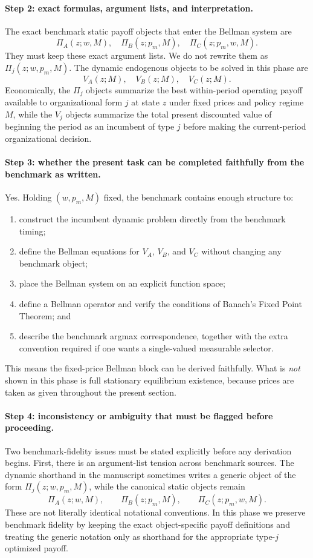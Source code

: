 \paragraph{Step 2: exact formulas, argument lists, and interpretation.}
The exact benchmark static payoff objects that enter the Bellman system are
\[
\Pi_A(z;w,M),\quad \Pi_B(z;p_m,M),\quad \Pi_C(z;p_m,w,M).
\]
They must keep these exact argument lists. We do not rewrite them as $\Pi_j(z;w,p_m,M)$. The dynamic endogenous objects to be solved in this phase are
\[
V_A(z;M),\quad V_B(z;M),\quad V_C(z;M).
\]
Economically, the $\Pi_j$ objects summarize the best within-period operating payoff available to organizational form $j$ at state $z$ under fixed prices and policy regime $M$, while the $V_j$ objects summarize the total present discounted value of beginning the period as an incumbent of type $j$ before making the current-period organizational decision.

\paragraph{Step 3: whether the present task can be completed faithfully from the benchmark as written.}
Yes. Holding $(w,p_m,M)$ fixed, the benchmark contains enough structure to:
\begin{enumerate}
    \item construct the incumbent dynamic problem directly from the benchmark timing;
    \item define the Bellman equations for $V_A$, $V_B$, and $V_C$ without changing any benchmark object;
    \item place the Bellman system on an explicit function space;
    \item define a Bellman operator and verify the conditions of Banach's Fixed Point Theorem; and
    \item describe the benchmark argmax correspondence, together with the extra convention required if one wants a single-valued measurable selector.
\end{enumerate}
This means the fixed-price Bellman block can be derived faithfully. What is \emph{not} shown in this phase is full stationary equilibrium existence, because prices are taken as given throughout the present section.

\paragraph{Step 4: inconsistency or ambiguity that must be flagged before proceeding.}
Two benchmark-fidelity issues must be stated explicitly before any derivation begins.
First, there is an argument-list tension across benchmark sources. The dynamic shorthand in the manuscript sometimes writes a generic object of the form $\Pi_j(z;w,p_m,M)$, while the canonical static objects remain
\[
\Pi_A(z;w,M),\qquad \Pi_B(z;p_m,M),\qquad \Pi_C(z;p_m,w,M).
\]
These are not literally identical notational conventions. In this phase we preserve benchmark fidelity by keeping the exact object-specific payoff definitions and treating the generic notation only as shorthand for the appropriate type-$j$ optimized payoff.

